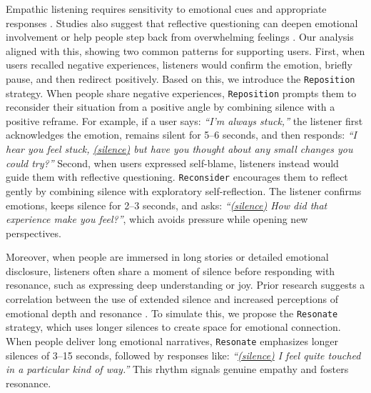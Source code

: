 Empathic listening requires sensitivity to emotional cues and appropriate responses \cite{bodie2015sensitivity}. Studies also suggest that reflective questioning can deepen emotional involvement or help people step back from overwhelming feelings \cite{bhattacharjee2024exploring}. Our analysis aligned with this, showing two common patterns for supporting users. First, when users recalled negative experiences, listeners would confirm the emotion, briefly pause, and then redirect positively. Based on this, we introduce the \texttt{Reposition} strategy. When people share negative experiences, \texttt{Reposition} prompts them to reconsider their situation from a positive angle by combining silence with a positive reframe. For example, if a user says: \textit{``I'm always stuck,''} the listener first acknowledges the emotion, remains silent for 5–6 seconds, and then responds: \textit{``I hear you feel stuck, \underline{(silence)} but have you thought about any small changes you could try?''} Second, when users expressed self-blame, listeners instead would guide them with reflective questioning. \texttt{Reconsider} encourages them to reflect gently by combining silence with exploratory self-reflection. The listener confirms emotions, keeps silence for 2–3 seconds, and asks: \textit{``\underline{(silence)} How did that experience make you feel?''}, which avoids pressure while opening new perspectives.

Moreover, when people are immersed in long stories or detailed emotional disclosure, listeners often share a moment of silence before responding with resonance, such as expressing deep understanding or joy. Prior research suggests a correlation between the use of extended silence and increased perceptions of emotional depth and resonance \cite{atmaja2020effect}. To simulate this, we propose the \texttt{Resonate} strategy, which uses longer silences to create space for emotional connection. When people deliver long emotional narratives, \texttt{Resonate} emphasizes longer silences of 3–15 seconds, followed by responses like: \textit{``\underline{(silence)} I feel quite touched in a particular kind of way.''} This rhythm signals genuine empathy and fosters resonance.



